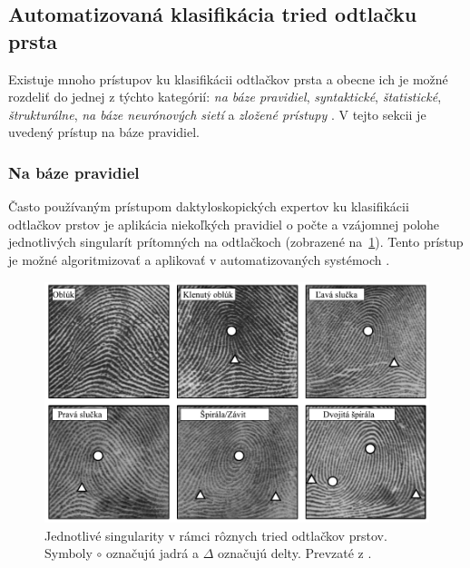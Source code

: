   \subsection{Automatizovaná klasifikácia tried odtlačku prsta} \label{sec:auto_klasif}
  Existuje mnoho prístupov ku klasifikácii odtlačkov prsta a obecne ich je možné rozdeliť do jednej z týchto kategórií: \emph{na báze pravidiel},
  \emph{syntaktické}, \emph{štatistické}, \emph{štrukturálne}, \emph{na báze neurónových sietí} a \emph{zložené prístupy} \cite{Handbook}. V tejto sekcii je
  uvedený prístup na báze pravidiel.

  \subsubsection*{Na báze pravidiel} \label{sec:rule-based}
  Často používaným prístupom daktyloskopických expertov ku klasifikácii odtlačkov prstov je aplikácia niekoľkých pravidiel o počte a vzájomnej polohe
  jednotlivých singularít prítomných na odtlačkoch (zobrazené na~{\ref{obr:singularity_v_triedach}}). Tento prístup je možné algoritmizovať a aplikovať
  v automatizovaných systémoch \cite{Handbook}.

  \begin{figure}[h]
    \centering
    \includegraphics[width=0.85\linewidth]{obrazky-figures/singularity_v_triedach.png}
    \caption{Jednotlivé singularity v rámci rôznych tried odtlačkov prstov. Symboly $\circ{}$ označujú jadrá a $\Delta{}$ označujú delty.
    Prevzaté z \cite{Handbook}.}
    \label{obr:singularity_v_triedach}
  \end{figure}

